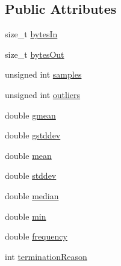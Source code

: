 \subsection*{Public Attributes}
\begin{DoxyCompactItemize}
\item 
size\-\_\-t \hyperlink{structperf_1_1performance__metrics_acc80b054d809b0b27fe98cb38ef41644}{bytes\-In}
\item 
size\-\_\-t \hyperlink{structperf_1_1performance__metrics_ae8105f19c84eedcba76269840dcdd6f4}{bytes\-Out}
\item 
unsigned int \hyperlink{structperf_1_1performance__metrics_acd73bcfd4dfec164085aaf9a7ad51277}{samples}
\item 
unsigned int \hyperlink{structperf_1_1performance__metrics_a3e8d2309ef014908443b2afc6d507495}{outliers}
\item 
double \hyperlink{structperf_1_1performance__metrics_aa9a6325145d8889de82f0093b0ff4461}{gmean}
\item 
double \hyperlink{structperf_1_1performance__metrics_a4ab0c3f1eb0a4c49b03583f26437fa74}{gstddev}
\item 
double \hyperlink{structperf_1_1performance__metrics_ae0393a0923fd1bc56ab29b74983daaf8}{mean}
\item 
double \hyperlink{structperf_1_1performance__metrics_a16a37f9f8ce16c12fa74706d4ebad44c}{stddev}
\item 
double \hyperlink{structperf_1_1performance__metrics_a2d5301f33545149ead1c377869914c8d}{median}
\item 
double \hyperlink{structperf_1_1performance__metrics_aad64808c4b1630ca869549f0b7fd08eb}{min}
\item 
double \hyperlink{structperf_1_1performance__metrics_ac15e72fc4e77cc73bc105229175fd786}{frequency}
\item 
int \hyperlink{structperf_1_1performance__metrics_aa09eac74a010795924bfe8d82bd3509a}{termination\-Reason}
\end{DoxyCompactItemize}


